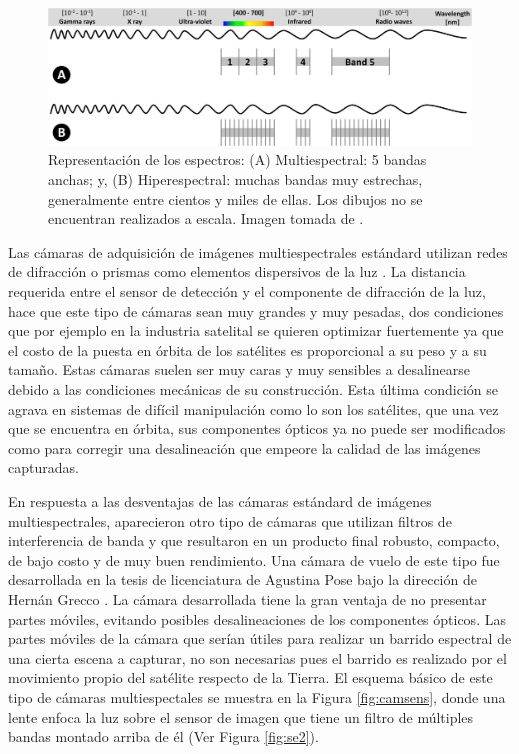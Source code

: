 \begin{figure}[H]
	\centering
	\includegraphics[scale=0.2]{Figs/plan_de_tesis/multivshyper.png}
	\caption{ Representación de los espectros: (A) Multiespectral: 5 
		bandas anchas; y, (B) Hiperespectral: muchas bandas muy estrechas, 
		generalmente entre cientos y miles de ellas. Los dibujos no se 
		encuentran 
		realizados a escala. Imagen tomada de \cite{Adao2017}.}
	\label{fig:spectrus}
\end{figure}


Las cámaras de adquisición de imágenes multiespectrales estándard utilizan 
redes de difracción o prismas como elementos dispersivos de la luz \cite{5459162}. La 
distancia requerida entre el sensor de detección y el componente de difracción 
de la luz, hace que este tipo de cámaras sean muy grandes y muy pesadas, dos 
condiciones que por ejemplo en la industria satelital se quieren optimizar 
fuertemente ya que el costo de la puesta en órbita de los satélites es 
proporcional a su peso y a su tamaño. Estas cámaras suelen ser muy caras y muy 
sensibles a desalinearse debido a las condiciones mecánicas de su construcción. 
Esta última condición se agrava en sistemas de difícil manipulación como lo son 
los satélites, que una vez que se encuentra en órbita, sus componentes ópticos 
ya no puede ser modificados como para corregir una desalineación que empeore la 
calidad de las imágenes capturadas.

En respuesta a las desventajas de las cámaras estándard de imágenes 
multiespectrales, aparecieron otro tipo de cámaras que utilizan filtros de 
interferencia de banda y que resultaron en un producto final robusto, compacto, 
de bajo costo y de muy buen rendimiento. Una cámara de vuelo 
de este tipo fue desarrollada en la tesis de licenciatura de Agustina Pose bajo 
la dirección de Hernán Grecco \cite{Pose2017}. 
La cámara desarrollada tiene la gran ventaja de no presentar partes móviles, 
evitando posibles desalineaciones de los componentes ópticos. Las partes 
móviles de la cámara que serían útiles para realizar un barrido espectral de 
una cierta escena a capturar, no son necesarias pues el barrido es realizado 
por el movimiento propio del satélite respecto de la Tierra. El esquema básico 
de este tipo de 
cámaras multiespectales se muestra 
en la Figura \ref{fig:camsens}, donde una lente enfoca la luz sobre el sensor de imagen que tiene un filtro de múltiples bandas montado arriba de él (Ver Figura \ref{fig:se2}).


